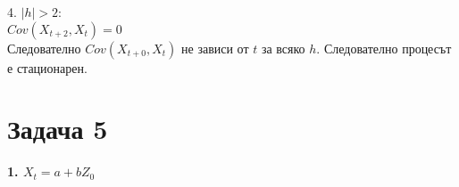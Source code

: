 \documentclass{article}
\begin{document}
\begin{flushleft}
\begin{flushleft}
4. $|h| > 2$: \\
$Cov(X_{t+2}, X_t) = 0$ \\
Следователно $Cov(X_{t+0}, X_t)$ не зависи от $t$ за всяко $h$. Следователно процесът е стационарен.

\end{flushleft}

\section*{Задача 5}
\begin{flushleft}

\textbf{1. $X_t = a + bZ_0$}
\begin{flushleft}
\end{flushleft}
\end{flushleft}


\end{flushleft}
\end{document}
